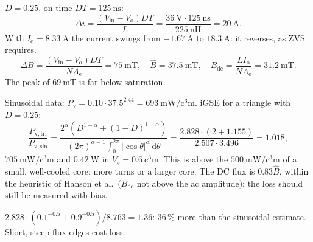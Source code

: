 
\begin{solutionblock}
	$D=0.25$, on-time $DT=\SI{125}{\nano\second}$:
	\begin{equation}
		\Delta i=\frac{(V_\mathrm{in}-V_\mathrm{o})DT}{L}=\frac{\SI{36}{\volt}\cdot\SI{125}{\nano\second}}{\SI{225}{\nano\henry}}=\SI{20}{\ampere}.
	\end{equation}
	With $I_\mathrm{o}=\SI{8.33}{\ampere}$ the current swings from $\SI{-1.67}{\ampere}$ to $\SI{18.3}{\ampere}$: it reverses, as ZVS requires.
	\begin{equation}
		\Delta B=\frac{(V_\mathrm{in}-V_\mathrm{o})DT}{NA_\mathrm{e}}=\SI{75}{\milli\tesla},\quad\hat{B}=\SI{37.5}{\milli\tesla},\quad B_\mathrm{dc}=\frac{LI_\mathrm{o}}{NA_\mathrm{e}}=\SI{31.2}{\milli\tesla}.
	\end{equation}
	The peak of $\SI{69}{\milli\tesla}$ is far below saturation.
\end{solutionblock}


\begin{solutionblock}
	Sinusoidal data: $P_\mathrm{v}=0.10\cdot37.5^{2.44}=\SI{693}{\milli\watt\per\cubic\centi\metre}$. iGSE for a triangle with $D=0.25$:
	\begin{equation}
		\frac{P_\mathrm{v,tri}}{P_\mathrm{v,sin}}=\frac{2^{\alpha}\left(D^{1-\alpha}+(1-D)^{1-\alpha}\right)}{(2\pi)^{\alpha-1}\int_0^{2\pi}|\cos\theta|^{\alpha}\,\mathrm{d}\theta}=\frac{2.828\cdot(2+1.155)}{2.507\cdot3.496}=1.018,
	\end{equation}
	$\SI{705}{\milli\watt\per\cubic\centi\metre}$ and $\SI{0.42}{\watt}$ in $V_\mathrm{e}=\SI{0.6}{\cubic\centi\metre}$. This is above the $\SI{500}{\milli\watt\per\cubic\centi\metre}$ of a small, well-cooled core: more turns or a larger core. The DC flux is $0.83\hat{B}$, within the heuristic of Hanson et al.\ ($B_\mathrm{dc}$ not above the ac amplitude); the loss should still be measured with bias.
\end{solutionblock}


\begin{solutionblock}
	$2.828\cdot(0.1^{-0.5}+0.9^{-0.5})/8.763=1.36$: 36\,\% more than the sinusoidal estimate. Short, steep flux edges cost loss.
\end{solutionblock}

